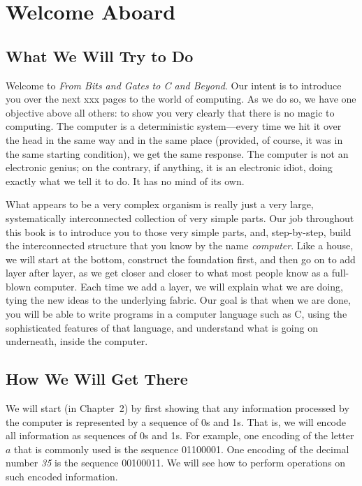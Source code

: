 \documentclass{patt}
\begin{document}
\chapter{Welcome Aboard}\label{chapt:welcome}

\vspace{21pt}

\section{What We Will Try to Do}

Welcome to {\em From Bits and Gates to C and Beyond}. Our intent
is to introduce you over the next xxx pages to the world
of computing. As we do so, we have one objective above all others:
to show you very clearly that there is no magic to computing. The
computer is a deterministic system---every time we hit it over the
head in the same way and in the same place (provided, of course,
it was in the same starting condition), we get the same response.
The computer is not an electronic genius; on the contrary, if
anything, it is an electronic idiot, doing exactly what we tell it
to do. It has no mind of its own.

What appears to be a very complex organism is really just a
very large, systematically interconnected collection of very simple parts.
Our job throughout this book is to introduce you to those very
simple parts, and, step-by-step, build the interconnected
structure that you know by the name {\em computer}. Like a
house, we will start at the bottom, construct the foundation
first, and then go on to add layer after layer, as we get
closer and closer to what most people know as a full-blown
computer. Each time we add a layer, we will explain what
we are doing, tying the new ideas to the underlying fabric.
Our goal is that when we are done, you will be able to write
programs in a computer language such as C, using the
sophisticated features of that language, and understand
what is going on underneath, inside the computer.

\pagebreak

\section{How We Will Get There}

We will start (in Chapter~2) by first showing that any information processed by
the computer is represented by a sequence of 0s and 1s.  That is, we will 
encode all information as sequences of 0s and 1s. For example, one encoding 
of the letter $a$ that is commonly used is the sequence 01100001.  One encoding
of the decimal number {\em 35} is the sequence 00100011.  We will see how to 
perform operations on such encoded information.
\end{document}
